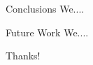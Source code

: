 \begin{frame}{Conclusions}
	We....
\end{frame}

\begin{frame}{Future Work}
	We....
\end{frame}

\begin{frame}
	\centering
	\LARGE{Thanks!}
\end{frame}